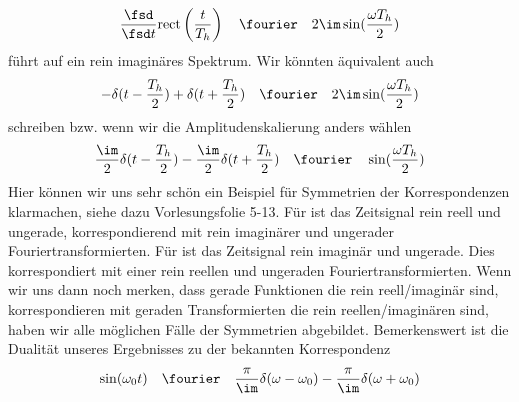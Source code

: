 \begin{Loesung}
\begin{equation}
  \frac{\fsd}{\fsd t} \mathrm{rect}\left(\frac{t}{T_h}\right) \quad\fourier\quad
  2\im\sin (\frac{\omega T_h}{2})
\end{equation}
führt auf ein rein imaginäres Spektrum.
Wir könnten äquivalent auch
\begin{equation}
\label{eq:04ADD03866_Sym1}
- \delta(t-\frac{T_h}{2}) + \delta(t+\frac{T_h}{2})  \quad\fourier\quad
2\im\sin (\frac{\omega T_h}{2})
\end{equation}
schreiben bzw. wenn wir die Amplitudenskalierung anders wählen
\begin{equation}
\label{eq:04ADD03866_Sym2}
\frac{\im}{2}\delta(t-\frac{T_h}{2}) - \frac{\im}{2}\delta(t+\frac{T_h}{2})\quad\fourier\quad
\sin(\frac{\omega T_h}{2})
\end{equation}
Hier können wir uns sehr schön ein Beispiel für Symmetrien der Korrespondenzen
klarmachen, siehe dazu Vorlesungsfolie 5-13.
%
Für  ist das Zeitsignal rein reell und ungerade, korrespondierend
mit rein imaginärer und ungerader Fouriertransformierten.
Für  ist das Zeitsignal rein imaginär und ungerade.
Dies korrespondiert mit einer rein reellen und ungeraden Fouriertransformierten.
Wenn wir uns dann noch merken, dass gerade Funktionen die rein reell/imaginär sind,
korrespondieren mit geraden Transformierten die rein reellen/imaginären sind,
haben wir alle möglichen Fälle der Symmetrien abgebildet.
Bemerkenswert ist die Dualität unseres Ergebnisses zu der bekannten Korrespondenz
\begin{equation}
\sin(\omega_0 t) \quad \fourier \quad \frac{\pi}{\im} \delta(\omega -\omega_0) - \frac{\pi}{\im} \delta(\omega + \omega_0)
\end{equation}
\end{Loesung}
















\newpage
